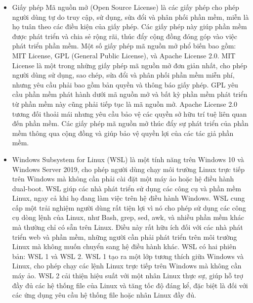 \begin{itemize}
    \item Giấy phép Mã nguồn mở (Open Source License) là các giấy phép cho phép người dùng tự do truy cập, sử dụng, sửa đổi và phân phối phần mềm, miễn là họ tuân theo các điều kiện của giấy phép. Các giấy phép này giúp phần mềm được phát triển và chia sẻ rộng rãi, thúc đẩy cộng đồng đóng góp vào việc phát triển phần mềm. Một số giấy phép mã nguồn mở phổ biến bao gồm: MIT License, GPL (General Public License), và Apache License 2.0. MIT License là một trong những giấy phép mã nguồn mở đơn giản nhất, cho phép người dùng sử dụng, sao chép, sửa đổi và phân phối phần mềm miễn phí, nhưng yêu cầu phải bao gồm bản quyền và thông báo giấy phép. GPL yêu cầu phần mềm phát hành dưới mã nguồn mở và bất kỳ phần mềm phát triển từ phần mềm này cũng phải tiếp tục là mã nguồn mở. Apache License 2.0 tương đối thoải mái nhưng yêu cầu bảo vệ các quyền sở hữu trí tuệ liên quan đến phần mềm. Các giấy phép mã nguồn mở thúc đẩy sự phát triển của phần mềm thông qua cộng đồng và giúp bảo vệ quyền lợi của các tác giả phần mềm.
\end{itemize}

\begin{itemize}
    \item Windows Subsystem for Linux (WSL) là một tính năng trên Windows 10 và Windows Server 2019, cho phép người dùng chạy môi trường Linux trực tiếp trên Windows mà không cần phải cài đặt một máy ảo hoặc hệ điều hành dual-boot. WSL giúp các nhà phát triển sử dụng các công cụ và phần mềm Linux, ngay cả khi họ đang làm việc trên hệ điều hành Windows. WSL cung cấp một trải nghiệm người dùng rất tiện lợi vì nó cho phép sử dụng các công cụ dòng lệnh của Linux, như Bash, grep, sed, awk, và nhiều phần mềm khác mà thường chỉ có sẵn trên Linux. Điều này rất hữu ích đối với các nhà phát triển web và phần mềm, những người cần phải phát triển trên môi trường Linux mà không muốn chuyển sang hệ điều hành khác. WSL có hai phiên bản: WSL 1 và WSL 2. WSL 1 tạo ra một lớp tương thích giữa Windows và Linux, cho phép chạy các lệnh Linux trực tiếp trên Windows mà không cần máy ảo. WSL 2 cải thiện hiệu suất với một nhân Linux thực sự, giúp hỗ trợ đầy đủ các hệ thống file của Linux và tăng tốc độ đáng kể, đặc biệt là đối với các ứng dụng yêu cầu hệ thống file hoặc nhân Linux đầy đủ. 
\end{itemize}

